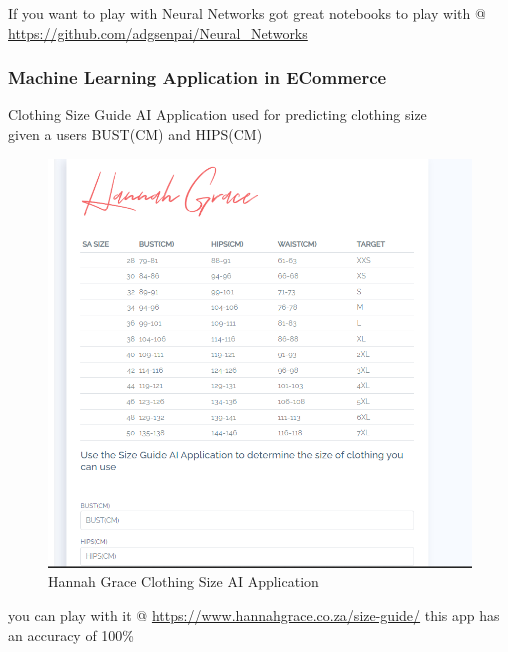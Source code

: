 If you want to play with Neural Networks got great notebooks to play with @ 
\url{https://github.com/adgsenpai/Neural_Networks}

\subsubsection{Machine Learning Application in ECommerce}

Clothing Size Guide AI Application used for predicting clothing size \\
given a users BUST(CM) and HIPS(CM) \\ 

\begin{figure}[H]
    \includegraphics[width=\linewidth]{images/hannahgrace.png}
    \caption{Hannah Grace Clothing Size AI Application}
    \label{fig:clothingai}
\end{figure}

you can play with it @ \url{https://www.hannahgrace.co.za/size-guide/} this app has an accuracy of 100\%